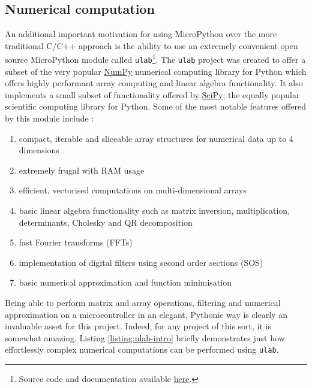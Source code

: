 \subsection{Numerical computation}
An additional important motivation for using MicroPython over the more traditional C/C++ approach is the ability to use an extremely convenient open source MicroPython module called \texttt{ulab}\footnote{Source code and documentation available \href{https://github.com/v923z/micropython-ulab}{here}.}. The \texttt{ulab} project was created to offer a subset of the very popular \href{https://numpy.org/}{NumPy} numerical computing library for Python which offers highly performant array computing and linear algebra functionality. It also implements a small subset of functionality offered by \href{https://www.scipy.org/}{SciPy}; the equally popular scientific computing library for Python. Some of the most notable features offered by this module include \cite{ulab}:
\begin{enumerate}
    \item compact, iterable and sliceable array structures for numerical data up to 4 dimensions
    \item extremely frugal with RAM usage
    \item efficient, vectorised computations on multi-dimensional arrays
    \item basic linear algebra functionality such as matrix inversion, multiplication, determinants, Cholesky and QR decomposition
    \item fast Fourier transforms (FFTs)
    \item implementation of digital filters using second order sections (SOS)
    \item basic numerical approximation and function minimisation
\end{enumerate}
Being able to perform matrix and array operations, filtering and numerical approximation on a microcontroller in an elegant, Pythonic way is clearly an invaluable asset for this project. Indeed, for any project of this sort, it is somewhat amazing. Listing \ref{listing:ulab-intro} briefly demonstrates just how effortlessly complex numerical computations can be performed using \texttt{ulab}.


